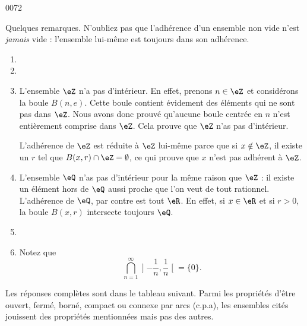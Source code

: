 
\begin{corrige}{0072}

Quelques remarques. N'oubliez pas que l'adhérence d'un ensemble non vide n'est \emph{jamais} vide : l'ensemble lui-même est toujours dans son adhérence.
\begin{enumerate}

\item
\item
\item
L'ensemble $\eZ$ n'a pas d'intérieur. En effet, prenons $n\in\eZ$ et considérons la boule $B(n,e)$. Cette boule contient évidement des éléments qui ne sont pas dans $\eZ$. Nous avons donc prouvé qu'aucune boule centrée en $n$ n'est entièrement comprise dans $\eZ$. Cela prouve que $\eZ$ n'as pas d'intérieur.

L'adhérence de $\eZ$ est réduite à $\eZ$ lui-même parce que si $x\notin\eZ$, il existe un $r$ tel que $B(x,r)\cap\eZ=\emptyset$, ce qui prouve que $x$ n'est pas adhérent à $\eZ$.

\item
L'ensemble $\eQ$ n'as pas d'intérieur pour la même raison que $\eZ$ : il existe un élément hors de $\eQ$ aussi proche que l'on veut de tout rationnel. L'adhérence de $\eQ$, par contre est tout $\eR$. En effet, si $x\in\eR$ et si $r>0$, la boule $B(x,r)$ intersecte toujours $\eQ$.
\item
\item
Notez que
\begin{equation}
	\bigcap_{n=1}^{\infty}\mathopen]-\frac{1}{ n },\frac{1}{ n }\mathclose[=\{ 0 \}.
\end{equation}
\end{enumerate}

Les réponses complètes sont dans le tableau suivant. Parmi les propriétés d'être ouvert, fermé, borné, compact ou connexe par arcs (c.p.a), les ensembles cités jouissent des propriétés mentionnées mais pas des autres.


\end{corrige}
